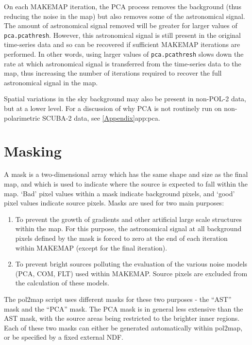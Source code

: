 On each MAKEMAP iteration, the PCA process removes the background (thus
reducing the noise in the map) but also removes some of the astronomical
signal. The amount of astronomical signal removed will be greater for
larger values of \texttt{pca.pcathresh}. However, this astronomical
signal is still present in the original time-series data and so can be
recovered if sufficient MAKEMAP iterations are performed. In other words,
using larger values of \texttt{pca.pcathresh} slows down the rate at
which astronomical signal is transferred from the time-series data to the
map, thus increasing the number of iterations required to recover the
full astronomical signal in the map.

Spatial variations in the sky background may also be present in non-POL-2
data, but at a lower level. For a discussion of why PCA is not routinely
run on non-polarimetric SCUBA-2 data, see \cref{Appendix}{app:pca}{}.



\section{Masking}
A mask is a two-dimensional array which has the same shape and size as
the final map, and which is used to indicate where the source is
expected to fall within the map. `Bad' pixel values within a mask
indicate background pixels, and `good' pixel values indicate source
pixels. Masks are used for two main purposes:

\begin{enumerate}
\item To prevent the growth of gradients and other artificial large
  scale structures within the map.  For this purpose, the astronomical
  signal at all background pixels defined by the mask is forced to
  zero at the end of each iteration within MAKEMAP (except for the
  final iteration).
\item To prevent bright sources polluting the evaluation of the
  various noise models (PCA, COM, FLT) used within MAKEMAP. Source
  pixels are excluded from the calculation of these models.
\end{enumerate}


The pol2map script uses different masks for these two purposes - the
``AST'' mask and the ``PCA'' mask.  The PCA mask is in general less
extensive than the AST mask, with the source areas being restricted to
the brighter inner regions.  Each of these two masks can either be
generated automatically within pol2map, or be specified by a fixed
external NDF.



